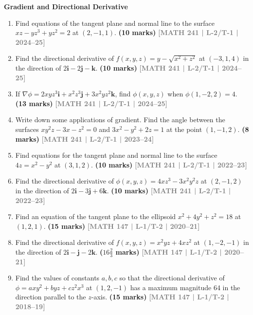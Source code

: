 \documentclass[12pt,a3paper]{article}
\newcommand{\yr}[1]{\hfill\textcolor{gray}{\small\textbf{[#1]}}}
\newcommand{\mk}[1]{\textcolor{orange!70!black}{\small\textbf{(#1 marks)}}}
\newcommand{\subtopic}[2]{%
  \vspace{10pt}
  \noindent\begin{tcolorbox}[colback=#1!8,colframe=#1,boxrule=0.6pt,arc=4pt,
    left=6pt,right=6pt,top=4pt,bottom=4pt]
    \small\bfseries\textcolor{#1}{#2}
  \end{tcolorbox}
  \vspace{2pt}
}
\begin{document}
\subtopic{cD}{Gradient and Directional Derivative}
\label{sub:s4-gradient}

\begin{enumerate}
    
\item Find equations of the tangent plane and normal line to the surface $xz-yz^{3}+yz^{2}=2$ at $(2,-1,1)$.
\mk{10} \yr{MATH 241 | L-2/T-1 | 2024--25}


\item Find the directional derivative of $f(x,y,z)=y-\sqrt{x^{2}+z^{2}}$ at $(-3,1,4)$ in the direction of $2\mathbf{i}-2\mathbf{j}-\mathbf{k}$.
\mk{10} \yr{MATH 241 | L-2/T-1 | 2024--25}


\item If $\nabla\phi=2xyz^{3}\mathbf{i}+x^{2}z^{3}\mathbf{j}+3x^{2}yz^{2}\mathbf{k}$, find $\phi(x,y,z)$ when $\phi(1,-2,2)=4$.
\mk{13} \yr{MATH 241 | L-2/T-1 | 2024--25}


\item Write down some applications of gradient. Find the angle between the surfaces $xy^{2}z-3x-z^{2}=0$ and $3x^{2}-y^{2}+2z=1$ at the point $(1,-1,2)$.
\mk{8} \yr{MATH 241 | L-2/T-1 | 2023--24}


\item Find equations for the tangent plane and normal line to the surface $4z=x^{2}-y^{2}$ at $(3,1,2)$.
\mk{10} \yr{MATH 241 | L-2/T-1 | 2022--23}


\item Find the directional derivative of $\phi(x,y,z)=4xz^{3}-3x^{2}y^{2}z$ at $(2,-1,2)$ in the direction of $2\mathbf{i}-3\mathbf{j}+6\mathbf{k}$.
\mk{10} \yr{MATH 241 | L-2/T-1 | 2022--23}


\item Find an equation of the tangent plane to the ellipsoid $x^{2}+4y^{2}+z^{2}=18$ at $(1,2,1)$.
\mk{15} \yr{MATH 147 | L-1/T-2 | 2020--21}


\item Find the directional derivative of $f(x,y,z)=x^{2}yz+4xz^{2}$ at $(1,-2,-1)$ in the direction of $2\mathbf{i}-\mathbf{j}-2\mathbf{k}$.
\mk{$16\tfrac{2}{3}$} \yr{MATH 147 | L-1/T-2 | 2020--21}


\item Find the values of constants $a,b,c$ so that the directional derivative of $\phi=axy^{2}+byz+cz^{2}x^{3}$ at $(1,2,-1)$ has a maximum magnitude 64 in the direction parallel to the $z$-axis.
\mk{15} \yr{MATH 147 | L-1/T-2 | 2018--19}



\end{enumerate}
\end{document}
